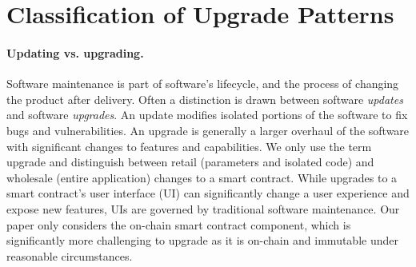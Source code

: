 


\section{Classification of Upgrade Patterns} \label{sec:classification}

\paragraph{Updating vs. upgrading.} Software maintenance is part of software's lifecycle, and the process of changing the product after delivery. Often a distinction is drawn between software \textit{updates} and software \textit{upgrades}. An update modifies isolated portions of the software to fix bugs and vulnerabilities. An upgrade is generally a larger overhaul of the software with significant changes to features and capabilities. We only use the term upgrade and distinguish between retail (parameters and isolated code) and wholesale (entire application) changes to a smart contract. While upgrades to a smart contract's user interface (UI) can significantly change a user experience and expose new features, UIs are governed by traditional software maintenance. Our paper only considers the on-chain smart contract component, which is significantly more challenging to upgrade as it is on-chain and immutable under reasonable circumstances.

